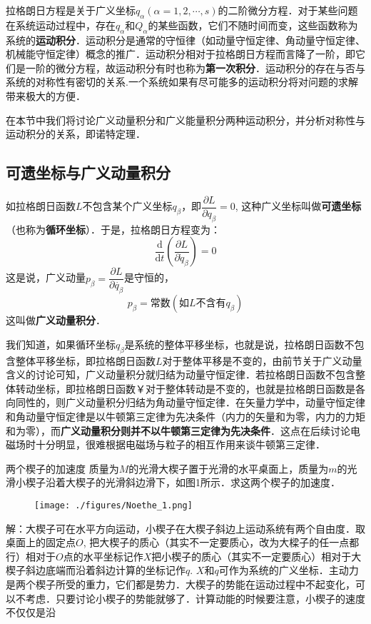 

拉格朗日方程是关于广义坐标$q_\alpha(\alpha=1,2,\cdots,s)$的二阶微分方程．对于某些问题在系统运动过程中，存在$q_\alpha$和$Q_\alpha$的某些函数，它们不随时间而变，这些函数称为系统的\textbf{运动积分}．运动积分是通常的守恒律（如动量守恒定律、角动量守恒定律、机械能守恒定律）概念的推广．运动积分相对于拉格朗日方程而言降了一阶，即它们是一阶的微分方程，故运动积分有时也称为\textbf{第一次积分}．运动积分的存在与否与系统的对称性有密切的关系.一个系统如果有尽可能多的运动积分将对问题的求解带来极大的方便．

在本节中我们将讨论广义动量积分和广义能量积分两种运动积分，并分析对称性与运动积分的关系，即诺特定理．

\subsection{可遗坐标与广义动量积分}

如拉格朗日函数$L$不包含某个广义坐标$q_\beta$，即$\dfrac{\partial L}{\partial q_\beta}=0$, 这种广义坐标叫做\textbf{可遗坐标}（也称为\textbf{循环坐标}）．于是，拉格朗日方程变为：
\begin{equation}
\frac{\mathrm{d}}{\mathrm{d} t}\left(\frac{\partial L}{\partial \dot{q}_{\beta}}\right)=0
\end{equation}
这是说，广义动量$p_\beta=\dfrac{\partial L} {\partial \dot{q_\beta}}$是守恒的，
\begin{equation}
p_\beta=常数(如L不含有q_\beta)
\end{equation}
这叫做\textbf{广义动量积分}．

我们知道，如果循环坐标$q_\beta$是系统的整体平移坐标，也就是说，拉格朗日函数不包含整体平移坐标，即拉格朗日函数$L $对于整体平移是不变的，由前节关于广义动量含义的讨论可知，广义动量积分就归结为动量守恒定律．若拉格朗日函数不包含整体转动坐标，即拉格朗日函数￥对于整体转动是不变的，也就是拉格朗日函数是各向同性的，则广义动量积分归结为角动量守恒定律．在矢量力学中，动量守恒定律和角动量守恒定律是以牛顿第三定律为先决条件（内力的矢量和为零，内力的力矩和为零），而\textbf{广义动量积分则并不以牛顿第三定律为先决条件}．这点在后续讨论电磁场时十分明显，很难根据电磁场与粒子的相互作用来谈牛顿第三定律．

\begin{example}{两个楔子的加速度}
质量为$M $的光滑大楔子置于光滑的水平桌面上，质量为$m$的光滑小楔子沿着大楔子的光滑斜边滑下，如图1所示．求这两个楔子的加速度．
\begin{figure}[ht]
\centering
\texttt{[image: ./figures/Noethe\_1.png]}
\caption{} \label{Noethe_fig1}
\end{figure}

解：大楔子可在水平方向运动，小楔子在大楔子斜边上运动系统有两个自由度．取桌面上的固定点$O$, 把大楔子的质心（其实不一定要质心，改为大樑子的任一点都行）相对于$O$点的水平坐标记作$X $把小楔子的质心（其实不一定要质心）相对于大楔子斜边底端而沿着斜边计算的坐标记作$q$. $X $和$q $可作为系统的广义坐标．主动力是两个楔子所受的重力，它们都是势力．大楔子的势能在运动过程中不起变化，可以不考虑．只要讨论小楔子的势能就够了．计算动能的时候要注意，小楔子的速度不仅仅是沿
\end{example}

